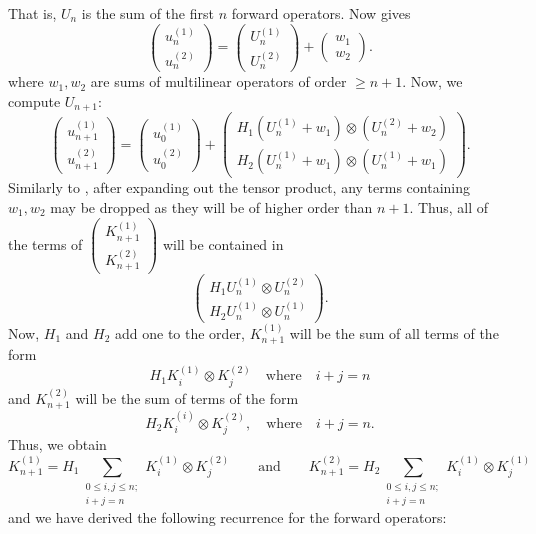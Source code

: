 \documentclass[a4paper, 12pt]{article}
\begin{document}
That is, $U_{n}$ is the sum of the first $n$ forward operators. Now   gives
\[
\begin{pmatrix} u_n^{(1)}\\u_n^{(2)} \end{pmatrix} = \begin{pmatrix} U_n^{(1)}\\U_n^{(2)} \end{pmatrix}+ \begin{pmatrix} w_1\\w_2 \end{pmatrix}
.\]
where $w_1,w_2$ are sums of multilinear operators of order $\ge n + 1$.
Now, we compute $U_{n + 1}$:
\[
\begin{pmatrix} u_{n + 1}^{(1)}\\u_{n + 1}^{(2)} \end{pmatrix}
= \begin{pmatrix} u_0^{(1)}\\u_0^{(2)} \end{pmatrix}+
\begin{pmatrix} H_1 \left(U_n^{(1)} + w_1\right)\otimes \left(U_n^{(2)} + w_2\right)\\H_2 \left(U_n^{(1)} + w_1\right) \otimes \left(U_n^{(1)} + w_1\right)\end{pmatrix}
.\]
Similarly to , after expanding out the tensor product, any terms containing $w_1, w_2$ may be dropped as they will be of higher order than $n + 1$.
Thus, all of the terms of $\begin{pmatrix} K_{n + 1}^{(1)}\\K_{n + 1}^{(2)} \end{pmatrix} $ will be contained in
\[
\begin{pmatrix} H_1 U_n^{(1)}\otimes U_n^{(2)}\\H_2 U_n^{(1)} \otimes U_n^{(1)}\end{pmatrix}
.\]
Now, $H_1$ and $H_2$ add one to the order, $K_{n + 1}^{(1)}$ will be the sum of all terms of the form
\[
H_1 K_i^{(1)}\otimes K_j^{(2)} \quad \text{where} \quad i + j = n
\]
 and
$K_{n + 1}^{(2)}$ will be the sum of terms of the form
\[
H_2 K_i^{(i)}\otimes K_j^{(2)}, \quad \text{where} \quad i + j = n
.\]
Thus, we obtain
 \[
	 K_{n + 1}^{(1)}= H_1\sum_{\substack{0\le i,j\le n;\\ i + j = n}} K_i^{(1)} \otimes K_j^{(2)}
	 \qquad \text{and} \qquad
	 K_{n + 1}^{(2)}= H_2\sum_{\substack{0\le i,j\le n;\\ i + j = n}} K_i^{(1)} \otimes K_j^{(1)}
\]
and we have derived the following recurrence for the forward operators:
\end{document}
